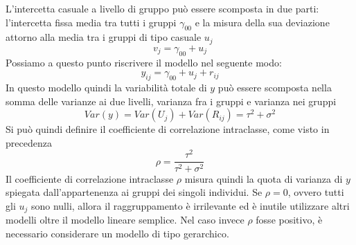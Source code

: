 \documentclass[a4page, 11pt]{article} %
\begin{document}
L’intercetta casuale a livello di gruppo può essere scomposta in due parti: l’intercetta fissa media tra tutti i gruppi $\gamma_{00}$ e la misura della sua deviazione attorno alla media tra i gruppi di tipo casuale $u_j$
\begin{equation*}
v_j=\gamma_{00}+u_j
\end{equation*}
Possiamo a questo punto riscrivere il modello nel seguente modo: 
\begin{equation*}
y_{ij}=\gamma_{00}+u_{j}+r_{ij}
\end{equation*}
In questo modello quindi la variabilità totale di $y$ può essere scomposta nella somma delle varianze ai due livelli, varianza fra i gruppi e varianza nei gruppi
\begin{equation*}
Var(y)=Var(U_j)+Var(R_{ij})=\tau^2+\sigma^2
\end{equation*}
Si può quindi definire il coefficiente di correlazione intraclasse, come visto in precedenza
\begin{equation*}
\rho = \frac{\tau^2}{\tau^2+\sigma^2}
\end{equation*} 
Il coefficiente di correlazione intraclasse $\rho$ misura quindi la quota di varianza di $y$ spiegata dall’appartenenza ai gruppi dei singoli individui. Se $\rho = 0$, ovvero tutti gli $u_j$ sono nulli, allora il raggruppamento è irrilevante ed è inutile utilizzare altri modelli oltre il modello lineare semplice. Nel caso invece $\rho$ fosse positivo, è necessario considerare un modello di tipo gerarchico.
\end{document}
